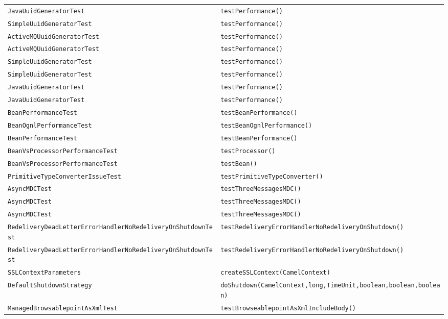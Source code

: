 \begin{center}
\begin{longtable}{ll}
\lstinline/JavaUuidGeneratorTest/&{\lstinline/testPerformance()/}\\
\lstinline/SimpleUuidGeneratorTest/&{\lstinline/testPerformance()/}\\
\lstinline/ActiveMQUuidGeneratorTest/&{\lstinline/testPerformance()/}\\
\lstinline/ActiveMQUuidGeneratorTest/&{\lstinline/testPerformance()/}\\
\lstinline/SimpleUuidGeneratorTest/&{\lstinline/testPerformance()/}\\
\lstinline/SimpleUuidGeneratorTest/&{\lstinline/testPerformance()/}\\
\lstinline/JavaUuidGeneratorTest/&{\lstinline/testPerformance()/}\\
\lstinline/JavaUuidGeneratorTest/&{\lstinline/testPerformance()/}\\
\lstinline/BeanPerformanceTest/&{\lstinline/testBeanPerformance()/}\\
\lstinline/BeanOgnlPerformanceTest/&{\lstinline/testBeanOgnlPerformance()/}\\
\lstinline/BeanPerformanceTest/&{\lstinline/testBeanPerformance()/}\\
\lstinline/BeanVsProcessorPerformanceTest/&{\lstinline/testProcessor()/}\\
\lstinline/BeanVsProcessorPerformanceTest/&{\lstinline/testBean()/}\\
\lstinline/PrimitiveTypeConverterIssueTest/&{\lstinline/testPrimitiveTypeConverter()/}\\
\lstinline/AsyncMDCTest/&{\lstinline/testThreeMessagesMDC()/}\\
\lstinline/AsyncMDCTest/&{\lstinline/testThreeMessagesMDC()/}\\
\lstinline/AsyncMDCTest/&{\lstinline/testThreeMessagesMDC()/}\\
\lstinline/RedeliveryDeadLetterErrorHandlerNoRedeliveryOnShutdownTest/&{\lstinline/testRedeliveryErrorHandlerNoRedeliveryOnShutdown()/}\\
\lstinline/RedeliveryDeadLetterErrorHandlerNoRedeliveryOnShutdownTest/&{\lstinline/testRedeliveryErrorHandlerNoRedeliveryOnShutdown()/}\\
\lstinline/SSLContextParameters/&{\lstinline/createSSLContext(CamelContext)/}\\
\lstinline/DefaultShutdownStrategy/&{\lstinline/doShutdown(CamelContext,long,TimeUnit,boolean,boolean,boolean)/}\\
\lstinline/ManagedBrowsablepointAsXmlTest/&{\lstinline/testBrowseablepointAsXmlIncludeBody()/}\\

\end{longtable}
\end{center}
